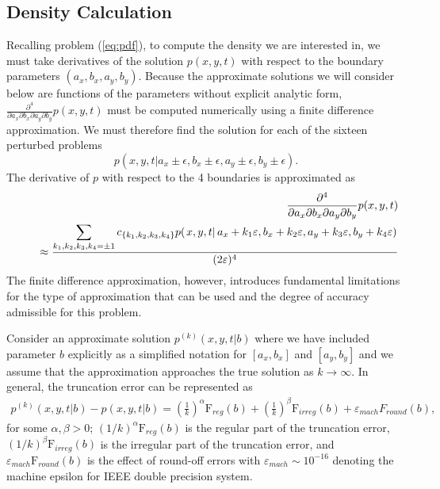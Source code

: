 \documentclass[10pt]{article}
\begin{document}
\subsection{Density Calculation} \label{sec:likelihood-calc}
Recalling problem (\ref{eq:pdf}), to compute the density we are
interested in, we must take derivatives of the solution $p(x,y,t)$
with respect to the boundary parameters $(a_x, b_x, a_y,
b_y)$. Because the approximate solutions we will consider below are
functions of the parameters without explicit analytic form,
$\frac{\partial^4}{\partial a_x\partial b_x \partial a_y \partial
  b_y}p(x,y,t)$ must be computed numerically using a finite difference
approximation. We must therefore find the solution for each of the
sixteen perturbed problems
\[
  p(x,y,t | a_x \pm \epsilon, b_x \pm \epsilon, a_y \pm \epsilon, b_y
  \pm \epsilon).
\]
The derivative of $p$ with respect to the 4 boundaries is approximated
as
\begin{eqnarray*}
& & \frac{\partial^4}{\partial a_x \partial b_x \partial a_y \partial b_y} p(x, y, t) 
\nonumber \\
& & \hspace*{0.5cm} \approx \frac{\displaystyle \sum_{k_1, k_2, k_3, k_4 = \pm 1}
c_{\{ k_1, k_2, k_3, k_4 \} } p(\left. x, y, t \right| a_x+k_1 \varepsilon, b_x+k_2 \varepsilon, 
a_y+k_3 \varepsilon, b_y+k_4 \varepsilon) }{(2 \varepsilon )^4} 
\nonumber
\end{eqnarray*}
The finite difference approximation, however, introduces fundamental
limitations for the type of approximation that can be used and the
degree of accuracy admissible for this problem.

Consider an approximate solution $p^{(k)}(\left. x, y, t \right| b)$
where we have included parameter $b $ explicitly as a simplified
notation for $[a_x, b_x]$ and $[a_y, b_y]$ and we assume that the
approximation approaches the true solution as $k \to \infty$. In
general, the truncation error can be represented as
\begin{align}
  p^{(k)}(x,y,t | b) - p(x,y,t | b) = \left( \frac{1}{k}
  \right)^{\alpha} \mbox{F}_{reg}(b) + \left( \frac{1}{k}
  \right)^{\beta}\mbox{F}_{irreg}(b) + \varepsilon_{mach}F_{round}(b), \label{eq:trunc-error}
\end{align}
for some $\alpha, \beta > 0$; $(1/k)^{\alpha} \mbox{F}_{reg}(b) $ is
the regular part of the truncation error,
$(1/k)^{\beta} \mbox{F}_{irreg}(b) $ is the irregular part of the
truncation error, and $\varepsilon_{mach} \mbox{F}_{round}(b) $ is the
effect of round-off errors with $\varepsilon_{mach} \sim 10^{-16}$
denoting the machine epsilon for IEEE double precision system.
\end{document}
